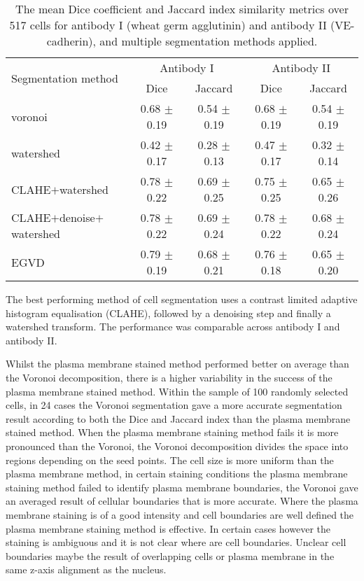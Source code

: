 \begin{table}
\caption{The mean Dice coefficient and Jaccard index similarity metrics over 517 cells for antibody I (wheat germ agglutinin) and antibody II (VE-cadherin), and multiple segmentation methods applied.}
\centering
\label{table:endothelial_morphometry:dice_jaccard}
\begin{tabular}{l c c c c}
\toprule
\multirow{2}{*}{Segmentation method} & \multicolumn{2}{c}{Antibody I} & \multicolumn{2}{c}{Antibody II} \\ 
\cmidrule{2-5}
	& Dice & Jaccard & Dice & Jaccard \\
\midrule
	voronoi & 0.68 $\pm$ 0.19 & 0.54 $\pm$ 0.19 & 0.68 $\pm$ 0.19 & 0.54 $\pm$ 0.19\\
	watershed & 0.42 $\pm$ 0.17 & 0.28 $\pm$ 0.13 & 0.47 $\pm$ 0.17 & 0.32 $\pm$ 0.14\\
	CLAHE$+$watershed & 0.78 $\pm$ 0.22 & 0.69 $\pm$ 0.25 & 0.75 $\pm$ 0.25 & 0.65 $\pm$ 0.26\\
	CLAHE$+$denoise$+$watershed & 0.78 $\pm$ 0.22 & 0.69 $\pm$ 0.24  & 0.78 $\pm$ 0.22 & 0.68 $\pm$ 0.24\\
	EGVD & 0.79 $\pm$ 0.19 & 0.68 $\pm$ 0.21 & 0.76 $\pm$ 0.18 & 0.65 $\pm$ 0.20\\
\bottomrule
\end{tabular}
\end{table}

The best performing method of cell segmentation uses a contrast limited adaptive histogram equalisation (CLAHE), followed by a denoising step and finally a watershed transform. The performance was comparable across antibody I and antibody II.

Whilst the plasma membrane stained method performed better on average than the Voronoi decomposition, there is a higher variability in the success of the plasma membrane stained method. Within the sample of 100 randomly selected cells, in 24 cases the Voronoi segmentation gave a more accurate segmentation result according to both the Dice and Jaccard index than the plasma membrane stained method. When the plasma membrane staining method fails it is more pronounced than the Voronoi, the Voronoi decomposition divides the space into regions depending on the seed points. The cell size is more uniform than the plasma membrane method, in certain staining conditions the plasma membrane staining method failed to identify plasma membrane boundaries, the Voronoi gave an averaged result of cellular boundaries that is more accurate. Where the plasma membrane staining is of a good intensity and cell boundaries are well defined the plasma membrane staining method is effective. In certain cases however the staining is ambiguous and it is not clear where are cell boundaries. Unclear cell boundaries maybe the result of overlapping cells or plasma membrane in the same z-axis alignment as the nucleus.

